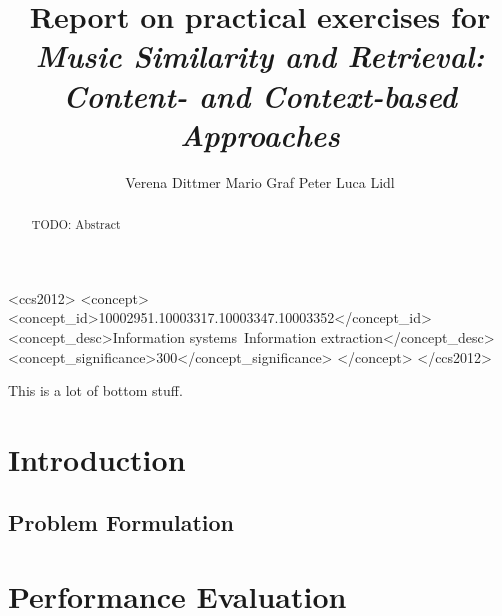 \documentclass[prodmode,acmtecs]{acmsmall} %
\begin{document}

\title{Report on practical exercises for \emph{Music Similarity and Retrieval: Content- and Context-based Approaches}}
\author{
Verena Dittmer
Mario Graf
Peter Luca Lidl
}

\begin{abstract}
TODO: Abstract
\end{abstract}

%
%
\begin{CCSXML}
<ccs2012>
<concept>
<concept_id>10002951.10003317.10003347.10003352</concept_id>
<concept_desc>Information systems~Information extraction</concept_desc>
<concept_significance>300</concept_significance>
</concept>
</ccs2012>
\end{CCSXML}


%
%



\begin{bottomstuff}
This is a lot of bottom stuff.
\end{bottomstuff}

\maketitle


\section{Introduction}

\subsection{Problem Formulation}

\section{Performance Evaluation}
\end{document}
